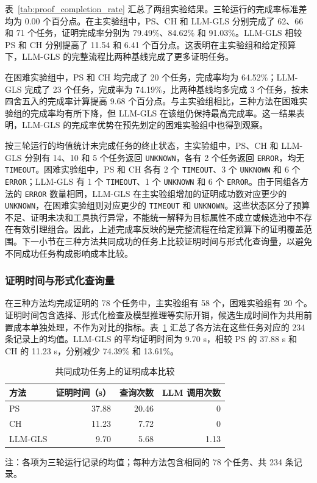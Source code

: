 表~\ref{tab:proof_completion_rate} 汇总了两组实验结果。三轮运行的完成率标准差均为 $0.00$ 个百分点。在主实验组中，PS、CH 和 LLM-GLS 分别完成了 62、66 和 71 个任务，证明完成率分别为 79.49\%、84.62\% 和 91.03\%。LLM-GLS 相较 PS 和 CH 分别提高了 11.54 和 6.41 个百分点。这表明在主实验组和给定预算下，LLM-GLS 的完整流程比两种基线完成了更多证明任务。

在困难实验组中，PS 和 CH 均完成了 20 个任务，完成率均为 64.52\%；LLM-GLS 完成了 23 个任务，完成率为 74.19\%，比两种基线均多完成 3 个任务，按未四舍五入的完成率计算提高 9.68 个百分点。与主实验组相比，三种方法在困难实验组的完成率均有所下降，但 LLM-GLS 在该组仍保持最高完成率。这一结果表明，LLM-GLS 的完成率优势在预先划定的困难实验组中也得到观察。

按三轮运行的均值统计未完成任务的终止状态，主实验组中，PS、CH 和 LLM-GLS 分别有 14、10 和 5 个任务返回 \texttt{UNKNOWN}，各有 2 个任务返回 \texttt{ERROR}，均无 \texttt{TIMEOUT}。困难实验组中，PS 和 CH 各有 2 个 \texttt{TIMEOUT}、3 个 \texttt{UNKNOWN} 和 6 个 \texttt{ERROR}；LLM-GLS 有 1 个 \texttt{TIMEOUT}、1 个 \texttt{UNKNOWN} 和 6 个 \texttt{ERROR}。由于同组各方法的 \texttt{ERROR} 数量相同，LLM-GLS 在主实验组增加的证明成功数对应更少的 \texttt{UNKNOWN}，在困难实验组则对应更少的 \texttt{TIMEOUT} 和 \texttt{UNKNOWN}。这些状态区分了预算不足、证明未决和工具执行异常，不能统一解释为目标属性不成立或候选池中不存在有效引理组合。因此，上述完成率反映的是完整流程在给定预算下的证明覆盖范围。下一小节在三种方法共同成功的任务上比较证明时间与形式化查询量，以避免不同成功任务构成影响成本比较。

\subsubsection{证明时间与形式化查询量}
在三种方法均完成证明的 78 个任务中，主实验组有 58 个，困难实验组有 20 个。证明时间包含选择、形式化检查及模型推理等实际开销，候选生成时间作为共用前置成本单独处理，不作为对比的指标。表~\ref{tab:proof_time_queries} 汇总了各方法在这些任务对应的 234 条记录上的均值。LLM-GLS 的平均证明时间为 9.70 s，相较 PS 的 37.88 s 和 CH 的 11.23 s，分别减少 74.39\% 和 13.61\%。

\begin{table}[t]
  \centering
  \caption{共同成功任务上的证明成本比较}
  \label{tab:proof_time_queries}
  \small
  \setlength{\tabcolsep}{4pt}
  \begin{tabular}{lrrr}
    \hline
    方法 & 证明时间（s） & 查询次数 & LLM 调用次数\\
    \hline
    PS      & 37.88 & 20.46 & 0\\
    CH      & 11.23 & 7.72 & 0\\
    LLM-GLS & 9.70  & 5.68 & 1.13\\
    \hline
  \end{tabular}
  \par\smallskip
  \begin{minipage}{\columnwidth}
    \footnotesize
    注：各项为三轮运行记录的均值；每种方法包含相同的 78 个任务、共 234 条记录。
  \end{minipage}
\end{table}

